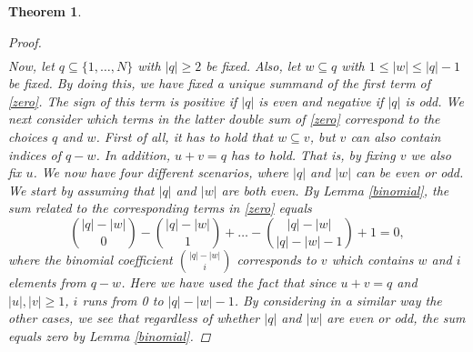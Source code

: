 \documentclass[english, a4paper, 12pt,reqno]{amsart}
\newtheorem{theorem}[defi]{Theorem}
\begin{document}
\begin{theorem}
\begin{proof}
\begin{equation}
\begin{split}
\end{split}
\end{equation}
Now, let $q \subseteq \{1,\dots,N\}$ with $|q|\geq 2$ be fixed. Also, let $w\subseteq q$ with $1\leq |w|\leq |q|-1$ be fixed. By doing this, we have fixed a unique summand of the first term of \eqref{zero}. The sign of this term is positive if $|q|$ is even and negative if $|q|$ is odd. We next consider which terms in the latter double sum of \eqref{zero} correspond to the choices $q$ and $w$. First of all, it has to hold that $w\subseteq v$, but $v$ can also contain indices of $q-w$. In addition, $u+v=q$ has to hold. That is, by fixing $v$ we also fix $u$. We now have four different scenarios, where $|q|$ and $|w|$ can be even or odd. We start by assuming that $|q|$ and $|w|$ are both even. By Lemma \ref{binomial}, the sum related to the corresponding terms in \eqref{zero} equals
\begin{equation}
\label{zero1}
\binom{|q|-|w|}{0} - \binom{|q|-|w|}{1}+\dots -\binom{|q|-|w|}{|q|-|w|-1} + 1 = 0,
\end{equation}
where the binomial coefficient $\binom{|q|-|w|}{i}$ corresponds to $v$ which contains $w$ and $i$ elements from $q-w$. Here we have used the fact that since $u+v = q$ and $|u|,|v| \geq 1$, $i$ runs from 0 to $|q| - |w| -1$. By considering in a similar way the other cases, we see that regardless of whether $|q|$ and $|w|$ are even or odd, the sum equals zero by Lemma \ref{binomial}. 
\end{proof}


\end{theorem}
\end{document}
